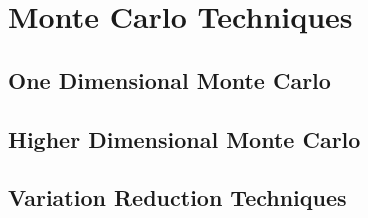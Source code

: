 \chapter{Monte Carlo Techniques}
\label{cha:MC}

\section{One Dimensional Monte Carlo}
\label{sec:MCOneD}

\section{Higher Dimensional Monte Carlo}
\label{sec:MCND}

\section{Variation Reduction Techniques}
\label{sec:VarReduction}

